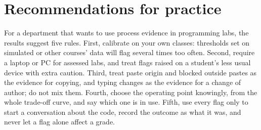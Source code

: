\section{Recommendations for practice}
\label{sec:disc-practice}
For a department that wants to use process evidence in programming labs, the
results suggest five rules. First, calibrate on your own classes: thresholds set
on simulated or other courses' data will flag several times too often. Second,
require a laptop or PC for assessed labs, and treat flags raised on a student's
less usual device with extra caution. Third, treat paste origin and blocked
outside pastes as the evidence for copying, and typing changes as the evidence
for a change of author; do not mix them. Fourth, choose the operating point
knowingly, from the whole trade-off curve, and say which one is in use. Fifth,
use every flag only to start a conversation about the code, record the outcome
as what it was, and never let a flag alone affect a grade.
